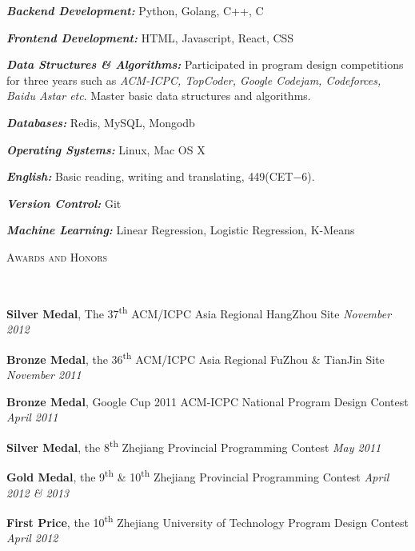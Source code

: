 ﻿\documentclass[9pt]{article}
\newenvironment{changemargin}[2]{%
  \begin{list}{}{%
    \setlength{\topsep}{0pt}%
    \setlength{\leftmargin}{#1}%
    \setlength{\rightmargin}{#2}%
    \setlength{\listparindent}{\parindent}%
    \setlength{\itemindent}{\parindent}%
    \setlength{\parsep}{\parskip}%
  }%
  \item[]}{\end{list}
}
\newcommand{\lineover}{
	\begin{changemargin}{-0.05in}{-0.05in}
		\vspace*{-8pt}
		\hrulefill \\
		\vspace*{-2pt}
	\end{changemargin}
}
\newcommand{\header}[1]{
	\begin{changemargin}{-0.5in}{-0.5in}
		\scshape{#1}\\
  	\lineover
	\end{changemargin}
}
\newenvironment{body} {
	\vspace*{-16pt}
	\begin{changemargin}{-0.25in}{-0.5in}
  }
	{\end{changemargin}
}
\newcommand\nth{\textsuperscript{th}} %
\begin{document}
\begin{body}
	\vspace{14pt}
	\emph{\textbf{Backend Development:}}{} Python, Golang, C++, C \\
	\medskip

    \emph{\textbf{Frontend Development:}}{} HTML, Javascript, React, CSS \\
    \medskip

    \emph{\textbf{Data Structures \& Algorithms:}}{} Participated in program design competitions for three years such as \emph{ACM-ICPC,
TopCoder, Google Codejam, Codeforces, Baidu Astar etc}. Master basic data structures and algorithms.\\
    \medskip

    \emph{\textbf{Databases:}}{} Redis, MySQL, Mongodb \\
    \medskip

    \emph{\textbf{Operating Systems:}}{} Linux, Mac OS X \\
    \medskip

    \emph{\textbf{English:}}{} Basic reading, writing and translating, 449(CET$-$6).\\
    \medskip

    \emph{\textbf{Version Control:}}{} Git
    \medskip

    \emph{\textbf{Machine Learning:}}{} Linear Regression, Logistic Regression, K-Means

\end{body}

\smallskip

\newpage
\header{Awards and Honors}

\begin{body}
	\vspace{14pt}

	\textbf{Silver Medal}, The 37\nth{} ACM/ICPC Asia Regional HangZhou Site \hfill{} \emph{November 2012}\\
	\smallskip

	\textbf{Bronze Medal}, the 36\nth{} ACM/ICPC Asia Regional FuZhou \& TianJin Site \hfill{} \emph{November 2011}\\
	\smallskip

	\textbf{Bronze Medal}, Google Cup 2011 ACM-ICPC National Program Design Contest \hfill{} \emph{April 2011}\\
	\smallskip

	\textbf{Silver Medal}, the 8\nth{} Zhejiang Provincial Programming Contest \hfill{} \emph{May 2011}\\
	\smallskip

	\textbf{Gold Medal}, the 9\nth{} \& 10\nth{} Zhejiang Provincial Programming Contest \hfill{} \emph{April 2012 \& 2013}\\
	\smallskip

	\textbf{First Price}, the 10\nth{} Zhejiang University of Technology Program Design Contest \hfill{} \emph{April 2012}\\
\end{body}
\end{document}
